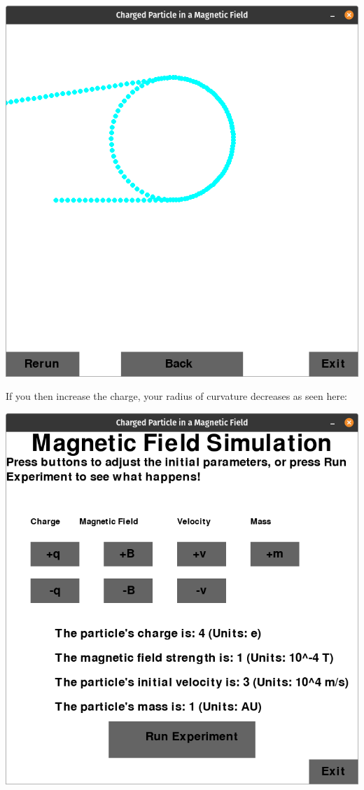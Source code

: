 \documentclass[11pt]{article}
\begin{document}
   			\includegraphics[scale=0.3]{2}
   			
   			If you then increase the charge, your radius of curvature decreases as seen here:
   			
   			\includegraphics[scale=0.3]{3}
   			
\end{document}
